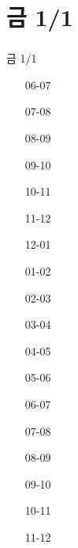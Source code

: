 \documentclass[aspectratio=1610,20pt,xcolor=pdftex,dvipsnames,table,handout]{beamer}
\begin{document}
	\section{금 1/1}											
	\begin{frame} [t,plain]											
	\frametitle{}											
		\begin{block} {금 1/1}										
		\setlength{\leftmargini}{3em}										
		\begin{itemize}										
			\item [06-07] \hrulefill									
			\item [07-08] \hrulefill									
			\item [08-09] \hrulefill									
			\item [09-10] \hrulefill									
			\item [10-11] \hrulefill									
			\item [11-12] \hrulefill									
			\item [12-01] \hrulefill									
			\item [01-02] \hrulefill									
			\item [02-03] \hrulefill									
			\item [03-04] \hrulefill									
			\item [04-05] \hrulefill									
			\item [05-06] \hrulefill									
			\item [06-07] \hrulefill									
			\item [07-08] \hrulefill									
			\item [08-09] \hrulefill									
			\item [09-10] \hrulefill									
			\item [10-11] \hrulefill									
			\item [11-12] \hrulefill									
		\end{itemize}										
		\end{block}										
	\end{frame}											
												
\end{document}
